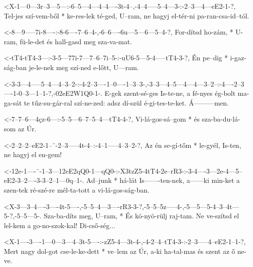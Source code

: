 
  {<X-1---0---3r--3---5---:-6--5---4---4--4----3t-4--,-4--4-----5--4---3-:-2--3---4---eE2-1-?,}
  {   Tel-jes szí-vem-ből * ke-res-lek té-ged, U--ram, ne hagyj el-tér-ni  pa-ran-csa-id--tól.}

  {<-8---9-----7i-8----:-8-6----7--6--4-,-6--6----6u---5---6---5--4-?,}
  {  For-dítsd ho-zám, * U-ram, fü-le-det és hall-gasd meg sza-va-mat.}

  {<-tT4-tT4-3---:-3-5---77i-7---7--6--7i--5-:-uU6-5---5-4-----tT4-3-?,}
  {  Én  pe--dig * i-gaz-ság-ban je-le-nek meg szí-ned e-lőtt, U---ram.}


  {<-3-3---4-----5--4---4--3--2-:-4-2--3----1--0----1--3--3-,-3--3---4--5---4---4---3--2--:-4----2--3----1-0--3---1--1-?,-02eE2W1Q0-1-.}
  {  E-gek szent-sé-ges Is-te-ne, a fé-nyes ég-bolt ma-ga-sát te tűz-su-gár-ral szí-ne-zed: adsz dí-szül é-gi-tes-te-ket. Á---------men.}

  {<-7--7--6---4çz-6---:-5--5---6--7--5--4---tT4-4-?,}
  {  Vi-lá-gos-sá--gom * és sza-ba-du-lá-som az  Úr.}

  {<-2--2--2--eE2-1--¨-2--3-----4t-4--:-4--1-----4--3--2-?,}
  {  Az én se-gí-tőm * le-gyél, Is-ten, ne hagyj el en-gem!}

  {<-12e-1----¨-1--3---12eE2qQ0-1---qQ0-:-X3tzZ5-4tT4-2e--rR3-:-3-4----3---2e-4---5--eE2-3--2----3-3--2--1---0q--1-.}
  {  Ad--junk * há-lát Is-------ten-nek,  a------ki   min-ket   a szen-tek ré-szé-re mél-ta-tott a vi-lá-gos-ság-ban.}

  {<X-3---3--4----3----4t-5----,-5--5--4---3----rR3-3-?,-5--5--5z-----4-,-5---5---5-4--3--4t---5-?,-5--5---5-.}
  {   Sza-ba-díts meg, U--ram, * És kö-nyö-rülj raj-tam. Ne ve-szítsd el  lel-kem a go-no-szok-kal! Di-cső-ség...}

  {<X-1----3----1---0---3---4--3t-5----:-zZ5-4---3t-4-,-4-2--4--tT4-3-:-2--3-----4--eE2-1--1-?,}
  {  Mert nagy dol-got cse-le-ke-dett * ve--lem az Úr, a-ki ha-tal-mas és szent az ő   ne-ve.}

